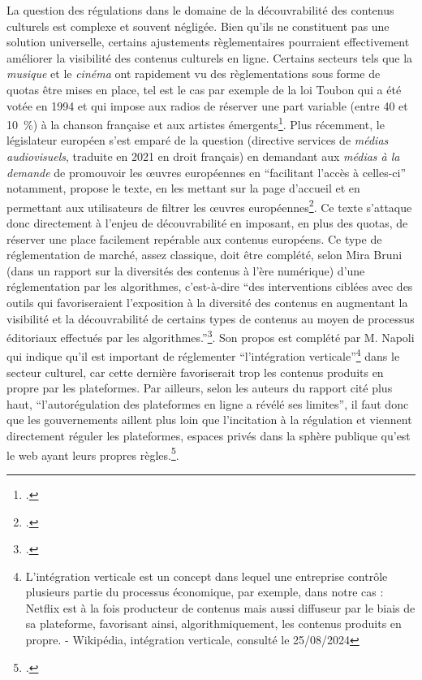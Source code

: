 La question des régulations dans le domaine de la découvrabilité des contenus culturels est complexe et souvent négligée. Bien qu’ils ne constituent pas une solution universelle, certains ajustements règlementaires pourraient effectivement améliorer la visibilité des contenus culturels en ligne. Certains secteurs tels que la \textit{musique} et le \textit{cinéma} ont rapidement vu des règlementations sous forme de quotas être mises en place, tel est le cas par exemple de la loi Toubon qui a été votée en 1994 et qui impose aux radios de réserver une part variable (entre 40 et 10 \%) à la chanson française et aux artistes émergents\footcite{noauthor_comprendre_2016}. Plus récemment, le législateur européen s’est emparé de la question (directive services de \textit{médias audiovisuels}, traduite en 2021 en droit français) en demandant aux \textit{médias à la demande} de promouvoir les œuvres européennes en \enquote{facilitant l’accès à celles-ci} notamment, propose le texte, en les mettant sur la page d’accueil et en permettant aux utilisateurs de filtrer les œuvres européennes\footcite{noauthor_directive_2019}. Ce texte s’attaque donc directement à l’enjeu de découvrabilité en imposant, en plus des quotas, de réserver une place facilement repérable aux contenus européens. Ce type de réglementation de marché, assez classique, doit être complété, selon Mira Bruni (dans un rapport sur la diversités des contenus à l'ère numérique) d'une réglementation par les algorithmes, c'est-à-dire \enquote{des interventions ciblées avec des outils qui favoriseraient l'exposition à la diversité des contenus en augmentant la visibilité et la découvrabilité de certains types de contenus au moyen de processus éditoriaux effectués par les algorithmes.}\footcite{canadien2019}. Son propos est complété par M. Napoli qui indique qu'il est important de réglementer \enquote{l'intégration verticale}\footnote{L'intégration verticale est un concept dans lequel une entreprise contrôle plusieurs partie du processus économique, par exemple, dans notre cas : Netflix est à la fois producteur de contenus mais aussi diffuseur par le biais de sa plateforme, favorisant ainsi, algorithmiquement, les contenus produits  en propre. - Wikipédia, intégration verticale, consulté le 25/08/2024} dans le secteur culturel, car cette dernière favoriserait trop les contenus produits en propre par les plateformes. Par ailleurs, selon les auteurs du rapport cité plus haut, \enquote{l'autorégulation des plateformes en ligne a révélé ses limites}, il faut donc que les gouvernements aillent plus loin que l'incitation à la régulation et viennent directement réguler les plateformes, espaces privés dans la sphère publique qu'est le web ayant leurs propres règles.\footcite{canadien2019}.  

